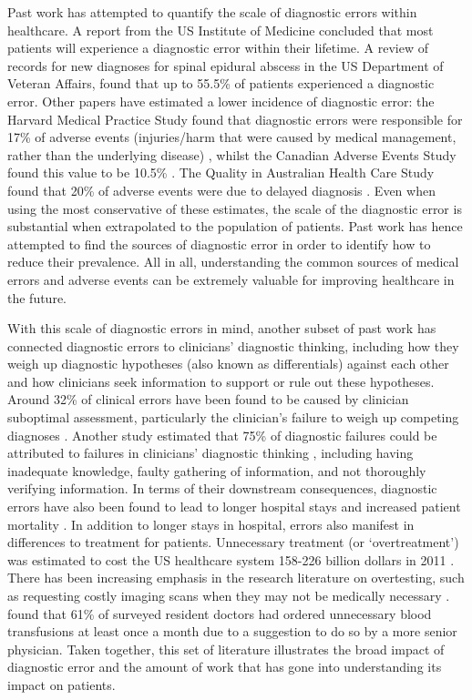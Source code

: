 \documentclass[a4paper, nobind]{templates/ociamthesis}
\begin{document}
\hfill\break
Past work has attempted to quantify the scale of diagnostic errors within healthcare. A report from the US Institute of Medicine concluded that most patients will experience a diagnostic error within their lifetime. A review of records for new diagnoses for spinal epidural abscess in the US Department of Veteran Affairs, \autocite{bhise_errors_2017} found that up to 55.5\% of patients experienced a diagnostic error. Other papers have estimated a lower incidence of diagnostic error: the Harvard Medical Practice Study found that diagnostic errors were responsible for 17\% of adverse events (injuries/harm that were caused by medical management, rather than the underlying disease) \autocite{kohn_errors_2000}, whilst the Canadian Adverse Events Study found this value to be 10.5\% \autocite{baker_canadian_2004}. The Quality in Australian Health Care Study found that 20\% of adverse events were due to delayed diagnosis \autocite{wilson_analysis_1999}. Even when using the most conservative of these estimates, the scale of the diagnostic error is substantial when extrapolated to the population of patients. Past work has hence attempted to find the sources of diagnostic error in order to identify how to reduce their prevalence. All in all, understanding the common sources of medical errors and adverse events can be extremely valuable for improving healthcare in the future.

\hfill\break
With this scale of diagnostic errors in mind, another subset of past work has connected diagnostic errors to clinicians' diagnostic thinking, including how they weigh up diagnostic hypotheses (also known as differentials) against each other and how clinicians seek information to support or rule out these hypotheses. Around 32\% of clinical errors have been found to be caused by clinician suboptimal assessment, particularly the clinician's failure to weigh up competing diagnoses \autocite{schiff_diagnostic_2009}. Another study estimated that 75\% of diagnostic failures could be attributed to failures in clinicians' diagnostic thinking \autocite{thammasitboon_diagnostic_2013}, including having inadequate knowledge, faulty gathering of information, and not thoroughly verifying information. In terms of their downstream consequences, diagnostic errors have also been found to lead to longer hospital stays and increased patient mortality \autocite{hautz_diagnostic_2019}. In addition to longer stays in hospital, errors also manifest in differences to treatment for patients. Unnecessary treatment (or `overtreatment') was estimated to cost the US healthcare system 158-226 billion dollars in 2011 \autocite{berwick_eliminating_2012}. There has been increasing emphasis in the research literature on overtesting, such as requesting costly imaging scans when they may not be medically necessary \autocite{carpenter_overtesting_2015}. \textcite{salem-schatz_influence_1990} found that 61\% of surveyed resident doctors had ordered unnecessary blood transfusions at least once a month due to a suggestion to do so by a more senior physician. Taken together, this set of literature illustrates the broad impact of diagnostic error and the amount of work that has gone into understanding its impact on patients.
\end{document}
